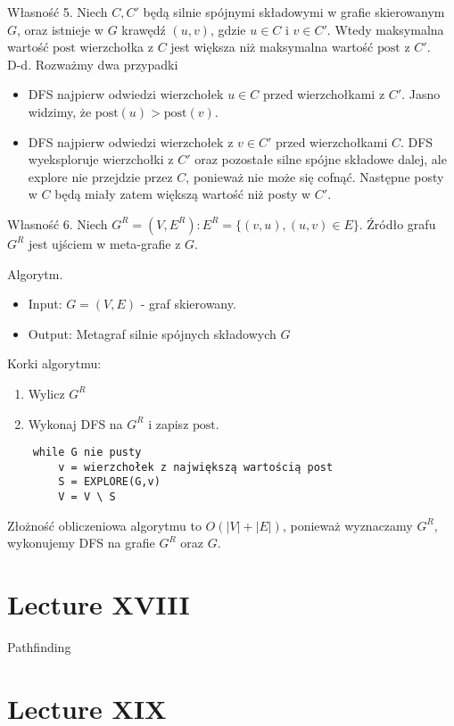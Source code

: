 \documentclass{article}
\numberwithin{equation}{subsection}
\begin{document}
\noindent
Własność 5. Niech $C, C'$ będą silnie spójnymi składowymi w grafie skierowanym $G$,
oraz istnieje w $G$ krawędź $(u,v)$, gdzie $u\in C$ i $v\in C'$. Wtedy maksymalna wartość $\text{post}$ wierzchołka z $C$ jest większa niż maksymalna wartość $\text{post}$ z $C'$.\\
D-d. Rozważmy dwa przypadki
\begin{itemize}
    \item DFS najpierw odwiedzi wierzchołek $u\in C$ przed wierzchołkami z $C'$. Jasno widzimy, że $\text{post}(u) > \text{post}(v)$.
    \item DFS najpierw odwiedzi wierzchołek z $v\in C'$ przed wierzchołkami $C$. DFS wyeksploruje wierzchołki z $C'$ oraz pozostałe silne spójne składowe dalej,
     ale explore nie przejdzie przez $C$, ponieważ nie może się cofnąć. Następne posty w $C$ będą miały zatem większą wartość niż posty w $C'$.
\end{itemize}

\noindent
Własność 6. Niech $G^R=(V,E^R) : E^R =\{(v,u), (u,v)\in E\}$. Źródło grafu $G^R$ jest ujściem w meta-grafie z $G$.

\noindent
Algorytm.
\begin{itemize}
    \item Input: $G=(V,E)$ - graf skierowany.
    \item Output: Metagraf silnie spójnych składowych $G$
\end{itemize}
Korki algorytmu:
\begin{enumerate}
    \item Wylicz $G^R$
    \item Wykonaj DFS na $G^R$ i zapisz $\text{post}$.
\end{enumerate}
\begin{verbatim}
    while G nie pusty
        v = wierzchołek z największą wartością post
        S = EXPLORE(G,v)
        V = V \ S
\end{verbatim}
Złożność obliczeniowa algorytmu to $O(|V|+|E|)$, ponieważ wyznaczamy $G^R$, wykonujemy DFS na grafie $G^R$ oraz $G$.

\section{Lecture XVIII}

Pathfinding

\section{Lecture XIX}
\end{document}
